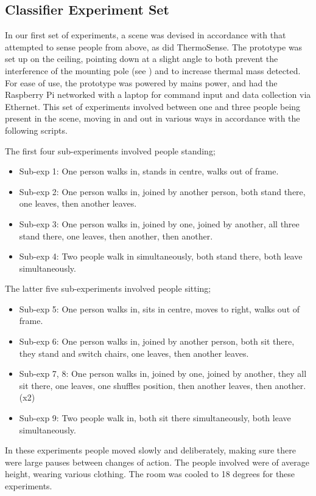 \documentclass[../thesis/thesis.tex]{subfiles}
\begin{document}
\subsection{Classifier Experiment Set}
In our first set of experiments, a scene was devised in accordance with  that attempted to sense people from above, as did ThermoSense. The prototype was set up on the ceiling, pointing down at a slight angle to both prevent the interference of the mounting pole (see ) and to increase thermal mass detected. For ease of use, the prototype was powered by mains power, and had the Raspberry Pi networked with a laptop for command input and data collection via Ethernet. This set of experiments involved between one and three people being present in the scene, moving in and out in various ways in accordance with the following scripts.

The first four sub-experiments involved people standing;
\begin{itemize}
\item Sub-exp 1: One person walks in, stands in centre, walks out of frame.
\item Sub-exp 2: One person walks in, joined by another person, both stand there, one leaves, then another leaves.
\item Sub-exp 3: One person walks in, joined by one, joined by another, all three stand there, one leaves, then another, then another.
\item Sub-exp 4: Two people walk in simultaneously, both stand there, both leave simultaneously.
\end{itemize}

The latter five sub-experiments involved people sitting;
\begin{itemize}
\item Sub-exp 5: One person walks in, sits in centre, moves to right, walks out of frame.
\item Sub-exp 6: One person walks in, joined by another person, both sit there, they stand and switch chairs, one leaves, then another leaves.
\item Sub-exp 7, 8: One person walks in, joined by one, joined by another, they all sit there, one leaves, one shuffles position, then another leaves, then another. (x2)
\item Sub-exp 9: Two people walk in, both sit there simultaneously, both leave simultaneously.
\end{itemize}

In these experiments people moved slowly and deliberately, making sure there were large pauses between changes of action. The people involved were of average height, wearing various clothing. The room was cooled to 18 degrees for these experiments.
\end{document}
